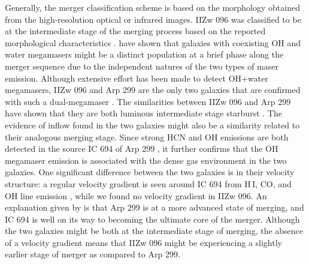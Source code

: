 \documentclass[]{aa} %
\newcommand{\HI}{{\rm H\,{\scriptsize I}}\xspace}
\begin{document}
Generally, the merger classification scheme is based on the morphology obtained from the high-resolution optical or infrared images. IIZw 096 was classified to be at the intermediate stage of the merging process based on the reported morphological characteristics \citep[e.g.,][] {1997AJ....113.1569G,2011AJ....141..100H,2021MNRAS.506.5935R}. \cite{2016ApJ...816...55W} have shown that galaxies with coexisting OH and water megamasers might be a distinct population at a brief phase along the merger sequence due to the independent natures of the two types of maser emission. Although extensive effort has been made to detect OH+water megamasers, IIZw 096 and Arp 299 are the only two galaxies that are confirmed with such a dual-megamaser \citep[see][and references therein]{2016ApJ...816...55W}. The similarities between IIZw 096 and Arp 299 have shown that they are both luminous intermediate stage starburst \citep[see][]{1997AJ....113.1569G,2010AJ....140...63I,2016ApJ...816...55W}. The evidence of inflow found in the two galaxies \citep[see][and Section 4.2.1]{2017A&A...597A.105F} might also be a similarity related to their analogous merging stage. Since strong HCN and OH emissions are both detected in the source IC 694 of Arp 299 \citep{1999A&A...346..663C,2002IAUS..206..430K}, it further confirms that the OH megamaser emission is associated with the dense gas environment in the two galaxies. One significant difference between the two galaxies is in their velocity structure: a regular velocity gradient is seen around IC 694 from \HI, CO, and OH line emission \citep{2000evn..conf..127P,2001IAUS..205..198P,1999A&A...346..663C}, while we found no velocity gradient in IIZw 096. An explanation given by \cite{1991ApJ...366L...1S} is that Arp 299 is at a more advanced state of merging, and IC 694 is well on its way to becoming the ultimate core of the merger. Although the two galaxies might be both at the intermediate stage of merging, the absence of a velocity gradient means that IIZw 096 might be experiencing a slightly earlier stage of merger as compared to Arp 299.
\end{document}
